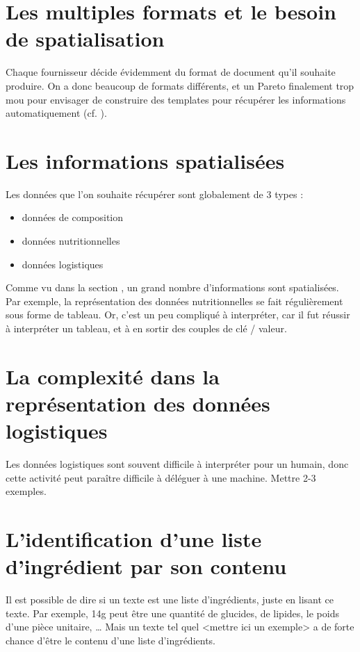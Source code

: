         \section{Les multiples formats et le besoin de \og spatialisation \fg}
        \label{formats_spatialisation}

        Chaque fournisseur décide évidemment du format de document qu'il souhaite produire.
        On a donc beaucoup de formats différents, et un Pareto finalement trop \og mou \fg pour envisager de construire des templates pour récupérer les informations automatiquement (cf. ).
    
        \section{Les informations \og spatialisées \fg}
        Les données que l'on souhaite récupérer sont globalement de 3 types : 
        \begin{itemize}
            \item données de composition
            \item données nutritionnelles
            \item données logistiques
        \end{itemize}

        Comme vu dans la section , un grand nombre d'informations sont spatialisées.
        Par exemple, la représentation des données nutritionnelles se fait régulièrement sous forme de tableau.
        Or, c'est un peu compliqué à interpréter, car il fut réussir à interpréter un tableau, et à en sortir des couples de clé / valeur.

        \section{La complexité dans la représentation des données logistiques}

        Les données logistiques sont souvent difficile à interpréter pour un humain, donc cette activité peut paraître difficile à déléguer à une machine.
        Mettre 2-3 exemples.

        \section{L'identification d'une liste d'ingrédient par son contenu}

        Il est possible de dire si un texte est une liste d'ingrédients, juste en lisant ce texte.
        Par exemple, \og 14g \fg peut être une quantité de glucides, de lipides, le poids d'une pièce unitaire, \dots
        Mais un texte tel quel <mettre ici un exemple> a de forte chance d'être le contenu d'une liste d'ingrédients.

